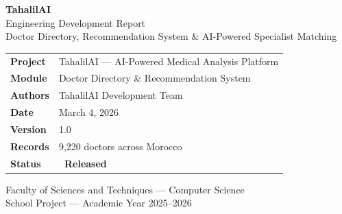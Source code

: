 \documentclass[12pt, a4paper]{article}
\newcommand{\badge}[2]{\colorbox{#1}{\color{white}\small\textbf{\ #2\ }}}
\begin{document}

\begin{titlepage}

  \vspace*{1.5cm}
  \begin{center}
    {\color{white}\fontsize{28}{34}\selectfont\bfseries TahalilAI}\\[0.4cm]
    {\color{white!80!gray}\fontsize{14}{18}\selectfont Engineering Development Report}\\[0.2cm]
    {\color{accent!60!white}\fontsize{11}{14}\selectfont
      Doctor Directory, Recommendation System \& AI-Powered Specialist Matching}
  \end{center}

  \vspace{4.5cm}

  \begin{center}
    \begin{tcolorbox}[
      enhanced, width=0.88\textwidth,
      colback=lightgray, colframe=primary,
      arc=4pt, boxrule=1pt,
      left=14pt, right=14pt, top=10pt, bottom=10pt
    ]
      \begin{tabular}{@{}ll}
        \textbf{Project}    & TahalilAI — AI-Powered Medical Analysis Platform \\[4pt]
        \textbf{Module}     & Doctor Directory \& Recommendation System \\[4pt]
        \textbf{Authors}    & TahalilAI Development Team \\[4pt]
        \textbf{Date}       & March 4, 2026 \\[4pt]
        \textbf{Version}    & 1.0 \\[4pt]
        \textbf{Records}    & 9,220 doctors across Morocco \\[4pt]
        \textbf{Status}     & \badge{success}{Released} \\
      \end{tabular}
    \end{tcolorbox}
  \end{center}

  \vfill
  \begin{center}
    \color{midgray}\small
    Faculty of Sciences and Techniques — Computer Science\\
    School Project — Academic Year 2025--2026
  \end{center}
\end{titlepage}
\end{document}
